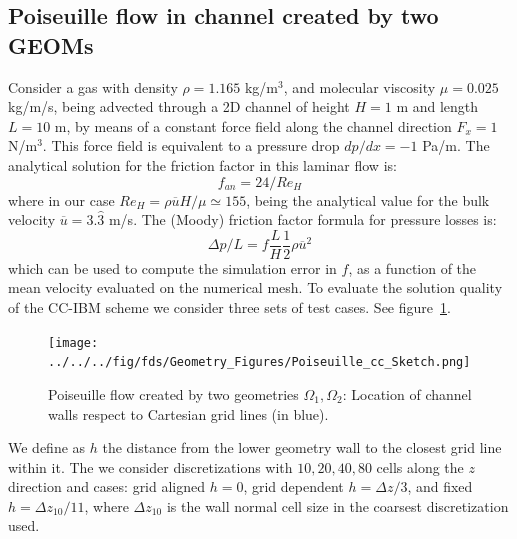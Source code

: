 \documentclass[11pt]{book}
\begin{document}
\subsection{Poiseuille flow in channel created by two GEOMs}

\label{sec:poiseuille_cc}

Consider a gas with density $\rho=1.165$ kg/m$^3$, and molecular viscosity $\mu=0.025$ kg/m/s, being advected through a 2D channel of height $H=1$ m and length $L=10$ m, by means of a constant force field along the channel direction $F_x=1$ N/m$^3$. This force field is equivalent to a pressure drop $dp/dx=-1$ Pa/m. The analytical solution for the friction factor in this laminar flow is:
%
\begin{equation}
   f_{an} = 24/Re_H
\end{equation}
%
where in our case $Re_H= \rho \overline{u} H/ \mu \simeq 155$, being the analytical value for the bulk velocity $\overline{u}=3.\hat{3}$ m/s. The (Moody) friction factor formula for pressure losses is:
%
\begin{equation}
   \Delta p / L = f \frac{L}{H}  \frac{1}{2} \rho \overline{u}^2
\end{equation}
%
which can be used to compute the simulation error in $f$, as a function of the mean velocity evaluated on the numerical mesh. To evaluate the solution quality of the CC-IBM scheme we consider three sets of test cases. See figure~\ref{Fig:PoiseSketch}.
%
\begin{figure}[h]
      \centering
      \texttt{[image: ../../../fig/fds/Geometry\_Figures/Poiseuille\_cc\_Sketch.png]}
      \caption{Poiseuille flow created by two geometries $\Omega_1, \Omega_2$: Location of channel walls respect to Cartesian grid lines (in blue).}
	\label{Fig:PoiseSketch}
\end{figure}
%
We define as $h$ the distance from the lower geometry wall to the closest grid line within it. The we consider discretizations with ${10,20,40,80}$ cells along the $z$ direction and cases: grid aligned $h=0$, grid dependent $h=\Delta z /3$, and fixed $h=\Delta z_{10}/11$, where $\Delta z_{10}$ is the wall normal cell size in the coarsest discretization used.
\end{document}
